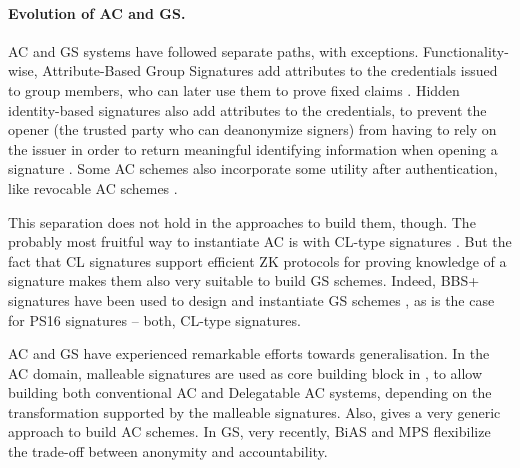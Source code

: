\paragraph{Evolution of AC and GS.} %
AC and GS systems have followed separate paths, with exceptions.
Functionality-wise, Attribute-Based Group Signatures add attributes to the
credentials issued to group members, who can later use them to prove fixed
claims \cite{emo09,aa14}. Hidden identity-based signatures also add attributes
to the credentials, to prevent the opener (the trusted party who
can deanonymize signers) from having to rely on the issuer in order to return
meaningful identifying information when opening a signature \cite{ks07}. Some AC
schemes also incorporate some utility after authentication, like
revocable AC schemes \cite{cks10}.

This separation does not hold in the approaches to build them, though. The
probably most fruitful way to instantiate AC is with CL-type signatures
\cite{cl02}. But the fact that CL signatures support efficient ZK protocols for
proving knowledge of a signature makes them also very suitable to build GS
schemes. Indeed, BBS+ signatures \cite{bbs04,cdl16b} have been used to design
and instantiate GS schemes \cite{gl19,dl21}, as is the case for PS16 signatures
\cite{ps16,cdl+20} -- both, CL-type signatures.

AC and GS have experienced remarkable efforts towards generalisation. In
the AC domain, malleable signatures are used as core building block in
\cite{cklm14}, to allow building both conventional AC and Delegatable AC
systems, depending on the transformation supported by the malleable signatures.
Also, \cite{ckl+15} gives a very generic approach to build AC schemes. In GS,
very recently, BiAS \cite{lnpy21} and MPS \cite{ngsy22} flexibilize the
trade-off between anonymity and accountability.


